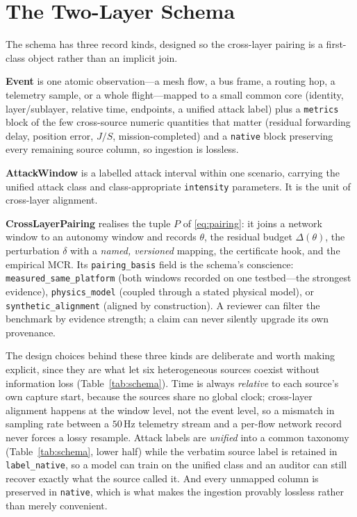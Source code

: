 \documentclass[conference]{IEEEtran}
\newcommand{\code}[1]{\texttt{#1}}
\begin{document}
\section{The Two-Layer Schema}
\label{sec:schema}
The schema has three record kinds, designed so the cross-layer pairing is a
first-class object rather than an implicit join.

\textbf{Event} is one atomic observation---a mesh flow, a bus frame, a routing
hop, a telemetry sample, or a whole flight---mapped to a small common core
(identity, layer/sublayer, relative time, endpoints, a unified attack label) plus
a \code{metrics} block of the few cross-source numeric quantities that matter
(residual forwarding delay, position error, $J/S$, mission-completed) and a
\code{native} block preserving every remaining source column, so ingestion is
lossless.

\textbf{AttackWindow} is a labelled attack interval within one scenario, carrying
the unified attack class and class-appropriate \code{intensity} parameters. It is
the unit of cross-layer alignment.

\textbf{CrossLayerPairing} realises the tuple $P$ of \eqref{eq:pairing}: it joins
a network window to an autonomy window and records $\theta$, the residual budget
$\Delta(\theta)$, the perturbation $\delta$ with a \emph{named, versioned}
mapping, the certificate hook, and the empirical MCR. Its \code{pairing\_basis}
field is the schema's conscience: \code{measured\_same\_platform} (both windows
recorded on one testbed---the strongest evidence), \code{physics\_model}
(coupled through a stated physical model), or \code{synthetic\_alignment}
(aligned by construction). A reviewer can filter the benchmark by evidence
strength; a claim can never silently upgrade its own provenance.

The design choices behind these three kinds are deliberate and worth making
explicit, since they are what let six heterogeneous sources coexist without
information loss (Table~\ref{tab:schema}). Time is always \emph{relative} to each
source's own capture start, because the sources share no global clock;
cross-layer alignment happens at the window level, not the event level, so a
mismatch in sampling rate between a $50$\,Hz telemetry stream and a per-flow
network record never forces a lossy resample. Attack labels are \emph{unified}
into a common taxonomy (Table~\ref{tab:schema}, lower half) while the verbatim
source label is retained in \code{label\_native}, so a model can train on the
unified class and an auditor can still recover exactly what the source called it.
And every unmapped column is preserved in \code{native}, which is what makes the
ingestion provably lossless rather than merely convenient.
\end{document}
